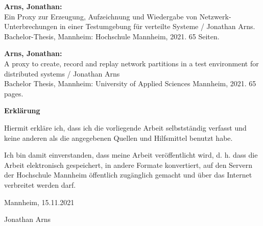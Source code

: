 \documentclass[12pt,a4paper]{report}
\begin{document}
\begin{small}
	\thispagestyle{empty}
	\linespread{1}
	\textbf{Arns, Jonathan:}\\
	Ein Proxy zur Erzeugung, Aufzeichnung und Wiedergabe von Netzwerk-Unter\-brech\-ungen in einer Testumgebung für verteilte Systeme
	/ Jonathan Arns. \textemdash \\ Bachelor-Thesis, Mannheim: Hochschule Mannheim, 2021. 65 Seiten.
    
    \vspace{1cm}
    \textbf{Arns, Jonathan:}\\
    A proxy to create, record and replay network partitions in a test environment for distributed systems / Jonathan Arns
    \textemdash \\ Bachelor Thesis, Mannheim: University of Applied Sciences Mannheim, 2021. 65 pages.
\end{small}

\newpage
\thispagestyle{empty}

\begin{Large}\textbf{Erklärung}\end{Large}

Hiermit erkläre ich, dass ich die vorliegende Arbeit selbstständig verfasst und keine anderen als die angegebenen Quellen und
Hilfsmittel benutzt habe.

Ich bin damit einverstanden, dass meine Arbeit veröffentlicht wird, d. h. dass die Arbeit elektronisch gespeichert, in andere
Formate konvertiert, auf den Servern der Hochschule Mannheim öffentlich zugänglich gemacht und über das Internet verbreitet
werden darf.

\vspace{1cm}

Mannheim, 15.11.2021

\vspace{1.5cm}

Jonathan Arns

\newpage
\end{document}
